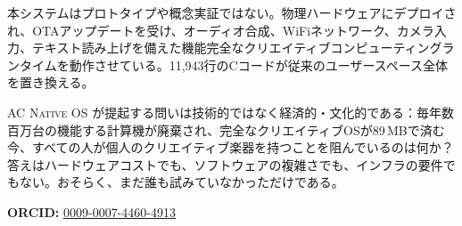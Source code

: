 \documentclass[10pt,letterpaper,twocolumn]{article}
\newcommand{\acos}{\textsc{AC Native OS}}
\begin{document}
本システムはプロトタイプや概念実証ではない。物理ハードウェアにデプロイされ、OTAアップデートを受け、オーディオ合成、WiFiネットワーク、カメラ入力、テキスト読み上げを備えた機能完全なクリエイティブコンピューティングランタイムを動作させている。11,943行のCコードが従来のユーザースペース全体を置き換える。

\acos{} が提起する問いは技術的ではなく経済的・文化的である：毎年数百万台の機能する計算機が廃棄され、完全なクリエイティブOSが89\,MBで済む今、すべての人が個人のクリエイティブ楽器を持つことを阻んでいるのは何か？答えはハードウェアコストでも、ソフトウェアの複雑さでも、インフラの要件でもない。おそらく、まだ誰も試みていなかっただけである。

\vspace{0.5em}
\noindent\textbf{ORCID:} \href{https://orcid.org/0009-0007-4460-4913}{0009-0007-4460-4913}




\end{document}
